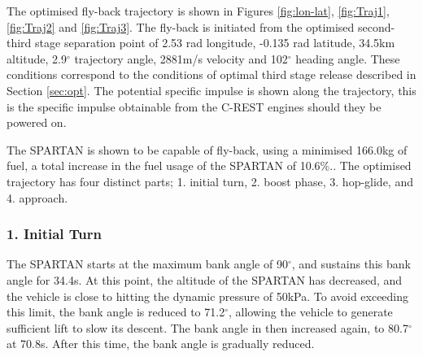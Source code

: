 \documentclass[journal]{new-aiaa} %
\begin{document}
The optimised fly-back trajectory is shown in Figures \ref{fig:lon-lat}, \ref{fig:Traj1}, \ref{fig:Traj2} and \ref{fig:Traj3}.
The fly-back is initiated from the optimised second-third stage separation point of 2.53 rad longitude, -0.135 rad latitude, 34.5km altitude, 2.9$^\circ$ trajectory angle, 2881m/s velocity and 102$^\circ$ heading angle. These conditions correspond to the conditions of optimal third stage release described in Section \ref*{sec:opt}. The potential specific impulse is shown along the trajectory, this is the specific impulse obtainable from the C-REST engines should they be powered on.

The SPARTAN is shown to be capable of fly-back, using a minimised 166.0kg of fuel, a total increase in the fuel usage of the SPARTAN of 10.6\%..
The optimised trajectory has four distinct parts; 1. initial turn, 2. boost phase, 3. hop-glide, and 4. approach. 

\subsubsection{1. Initial Turn}
The SPARTAN starts at the maximum bank angle of 90$^\circ$, and sustains this bank angle for 34.4s. At this point, the altitude of the SPARTAN has decreased, and the vehicle is close to hitting the dynamic pressure of 50kPa. To avoid exceeding this limit, the bank angle is reduced to 71.2$^\circ$, allowing the vehicle to generate sufficient lift to slow its descent. The bank angle in then increased again, to 80.7$^\circ$ at 70.8s. After this time, the bank angle is gradually reduced. 
\end{document}
